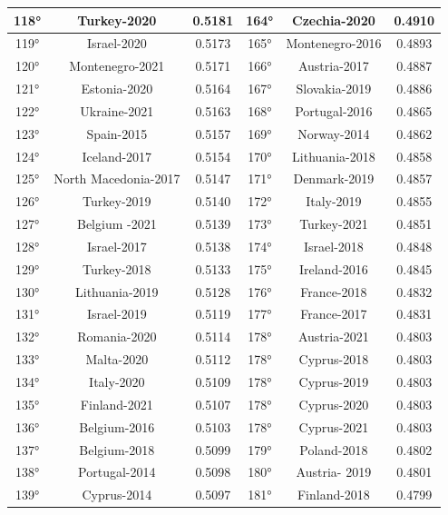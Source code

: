\documentclass[a4paper,12pt, openright]{report}
\begin{document}
\begin{longtable}[c]{|c|c|c|c|c|c|}
    \hline
    118° &  Turkey-2020 & 0.5181 & 164° &  Czechia-2020 & 0.4910 \\
    \hline
    119° &  Israel-2020 & 0.5173 & 165° &  Montenegro-2016 & 0.4893 \\
    \hline
    120° &  Montenegro-2021 & 0.5171 & 166° & Austria-2017 & 0.4887 \\
    \hline
    121° &  Estonia-2020 & 0.5164 & 167° &  Slovakia-2019 & 0.4886 \\
    \hline
    122° &  Ukraine-2021 & 0.5163 & 168° &  Portugal-2016 & 0.4865 \\
    \hline
    123° &  Spain-2015 & 0.5157 & 169° &  Norway-2014 & 0.4862 \\
    \hline
    124° &  Iceland-2017 & 0.5154 & 170° &  Lithuania-2018 & 0.4858 \\
    \hline
    125° &  North Macedonia-2017 & 0.5147 & 171° &  Denmark-2019 & 0.4857 \\
    \hline
    126° &  Turkey-2019 & 0.5140 & 172° &  Italy-2019 & 0.4855 \\
    \hline
    127° &  Belgium -2021 & 0.5139 & 173° &  Turkey-2021 & 0.4851 \\
    \hline
    128° &  Israel-2017 & 0.5138 & 174° &  Israel-2018 & 0.4848 \\
    \hline
    129° &  Turkey-2018 & 0.5133 & 175° &  Ireland-2016 & 0.4845 \\
    \hline
    130° &  Lithuania-2019 & 0.5128 & 176° &  France-2018 & 0.4832 \\
    \hline
    131° &  Israel-2019 & 0.5119 & 177° &  France-2017 & 0.4831 \\
    \hline
    132° &  Romania-2020 & 0.5114 & 178° &  Austria-2021 & 0.4803 \\
    \hline
    133° &  Malta-2020 & 0.5112 & 178° &  Cyprus-2018 & 0.4803 \\
    \hline
    134° &  Italy-2020 & 0.5109 & 178° &  Cyprus-2019 & 0.4803 \\
    \hline
    135° &  Finland-2021 & 0.5107 & 178° &  Cyprus-2020 & 0.4803 \\
    \hline
    136° & Belgium-2016 & 0.5103 & 178° & Cyprus-2021 & 0.4803 \\
    \hline
    137° &  Belgium-2018 & 0.5099 & 179° &  Poland-2018 & 0.4802 \\
    \hline
    138° & Portugal-2014 & 0.5098 & 180° &  Austria- 2019 & 0.4801 \\
    \hline
    139° &  Cyprus-2014 & 0.5097 & 181° &  Finland-2018 & 0.4799 \\

\end{longtable}
\end{document}
